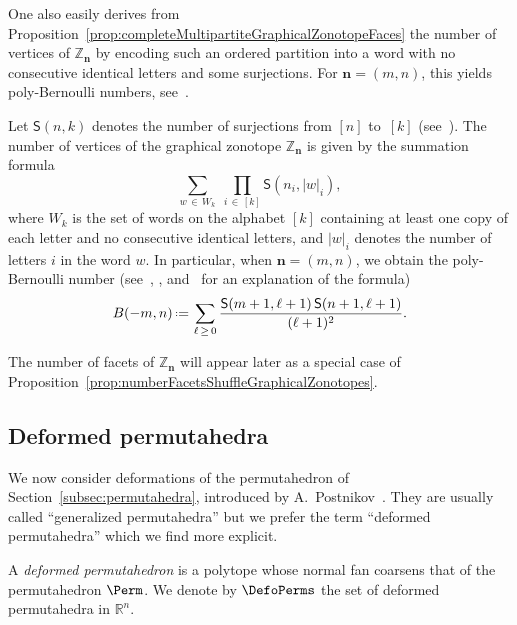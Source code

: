 \documentclass[AHL,Unicode,longabstracts,published]{cedram}
\newcommand{\R}{\mathbb{R}}
\renewcommand{\b}[1]{\boldsymbol{#1}}
\newcommand{\eqdef}{\mbox{\,\raisebox{0.2ex}{\scriptsize\ensuremath{\mathrm:}}\ensuremath{=}\,}}
\newcommand{\OEIS}[1]{{\rm \href{http://oeis.org/#1}{\texttt{#1}}}}
\newcommand{\polytope}[1]{\mathds{#1}}
\newcommand{\surjections}[2]{\mathsf{S}(#1,#2)}
\begin{document}
One also easily derives from Proposition~\ref{prop:completeMultipartiteGraphicalZonotopeFaces} the number of vertices of $\polytope{Z}_{\b{n}}$ by encoding such an ordered partition into a word with no consecutive identical letters and some surjections. For ${\b{n} = (m,n)}$, this yields poly-Bernoulli numbers, see~\cite{ArakawaKaneko-multipleZetaValues,ArakawaKaneko-polyBernoulli,BenyiHajnal-polyBernoulli1, BenyiHajnal-polyBernoulli2,CameronGlassSchumacher,Kaneko-polyBernoulli}.

\begin{prop}\label{prop:completeMultipartiteGraphicalZonotopeNumberVertices}
Let $\surjections{n}{k}$ denotes the number of surjections from $[n]$ to~$[k]$ (see~\cite[\OEIS{A019538}]{OEIS}). The number of vertices of the graphical zonotope $\polytope{Z}_{\b{n}}$ is given by the summation formula
\[
\sum_{w\, \in\,W_k}\; \prod_{i\,\in\,[k]} \surjections{n_i}{|w|_i},
\]
where $W_k$ is the set of words on the alphabet $[k]$ containing at least one copy of each letter and no consecutive identical letters, and $|w|_i$ denotes the number of letters $i$ in the word $w$. In particular, when $\b{n} = (m,n)$, we obtain the poly-Bernoulli number (see~\cite{Kaneko-polyBernoulli}, \cite [\OEIS{A099594}]{OEIS}, and~\cite{CameronGlassSchumacher} for an explanation of the formula)
\[
B(-m,n) \eqdef \sum_{\ell\,\ge\,0} \frac{\surjections{m+1}{\ell+1} \, \surjections{n+1}{\ell+1}}{(\ell+1)^2}.
\]
\end{prop}


The number of facets of $\polytope{Z}_{\b{n}}$ will appear later as a special case of Proposition~\ref{prop:numberFacetsShuffleGraphicalZonotopes}.



\subsection{Deformed permutahedra}\label{subsec:deformedPermutahedra}

We now consider deformations of the permutahedron of Section~\ref{subsec:permutahedra}, introduced by A.~Postnikov~\cite{Postnikov, PostnikovReinerWilliams}. They are usually called ``generalized permutahedra'' but we prefer the term ``deformed permutahedra'' which we find more explicit.

\begin{defi}\label{def:generalizedPermutahedron}
A
\emph{deformed permutahedron} is a polytope whose normal fan coarsens that of the permutahedron $\Perm$. We denote by $\DefoPerms$ the set of deformed permutahedra in $\R^n$.
\end{defi}
\end{document}

